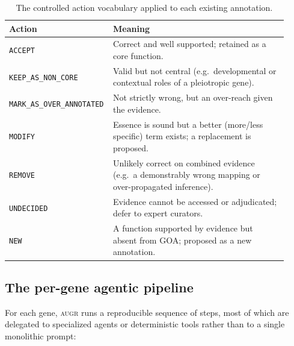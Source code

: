 \documentclass[11pt]{article}
\newcommand{\augr}{\textsc{augr}}
\newcommand{\code}[1]{\texttt{#1}}
\begin{document}
\begin{table}[htbp]
\centering
\caption{The controlled action vocabulary applied to each existing annotation.}
\label{tab:actions}
\small
\begin{tabular}{@{}>{\raggedright\arraybackslash}p{0.30\linewidth}>{\raggedright\arraybackslash}p{0.62\linewidth}@{}}
\toprule
\textbf{Action} & \textbf{Meaning} \\
\midrule
\code{ACCEPT} & Correct and well supported; retained as a core function. \\
\code{KEEP\_AS\_NON\_CORE} & Valid but not central (e.g.\ developmental or contextual roles of a pleiotropic gene). \\
\code{MARK\_AS\_OVER\_ANNOTATED} & Not strictly wrong, but an over-reach given the evidence. \\
\code{MODIFY} & Essence is sound but a better (more/less specific) term exists; a replacement is proposed. \\
\code{REMOVE} & Unlikely correct on combined evidence (e.g.\ a demonstrably wrong mapping or over-propagated inference). \\
\code{UNDECIDED} & Evidence cannot be accessed or adjudicated; defer to expert curators. \\
\code{NEW} & A function supported by evidence but absent from GOA; proposed as a new annotation. \\
\bottomrule
\end{tabular}
\end{table}

\subsection{The per-gene agentic pipeline}

For each gene, \augr{} runs a reproducible sequence of steps, most of which are
delegated to specialized agents or deterministic tools rather than to a single
monolithic prompt:
\end{document}
